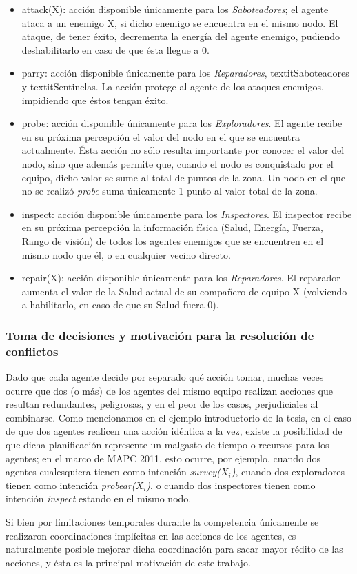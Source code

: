 \begin{itemize}

\item attack(X): acción disponible únicamente para los
\textit{Saboteadores}; el agente ataca a un enemigo X, si dicho
enemigo se encuentra en el mismo nodo.
El ataque, de tener éxito, decrementa la energía del agente enemigo,
pudiendo deshabilitarlo en caso de que ésta llegue a 0.

\item parry: acción disponible únicamente para los
\textit{Reparadores}, textit{Saboteadores} y textit{Sentinelas}.
La acción protege al agente de los ataques enemigos, impidiendo que
éstos tengan éxito.

\item probe: acción disponible únicamente para los
\textit{Exploradores}.
El agente recibe en su próxima percepción el valor del nodo en el que
se encuentra actualmente.
Ésta acción no sólo resulta importante por conocer el valor del nodo,
sino que además permite que, cuando el nodo es conquistado por el
equipo, dicho valor se sume al total de puntos de la zona.
Un nodo en el que no se realizó \textit{probe} suma únicamente 1 punto
al valor total de la zona.

\item inspect: acción disponible únicamente para los
\textit{Inspectores}.
El inspector recibe en su próxima percepción la información física
(Salud, Energía, Fuerza, Rango de visión) de todos los agentes
enemigos que se encuentren en el mismo nodo que él, o en cualquier
vecino directo.

\item repair(X): acción disponible únicamente para los
\textit{Reparadores}.
El reparador aumenta el valor de la Salud actual de su compañero de
equipo X (volviendo a habilitarlo, en caso de que su Salud fuera 0).

\end{itemize}


\subsubsection{Toma de decisiones y motivación para la resolución de
conflictos} \label{sec:toma_de_decisiones}


Dado que cada agente decide por separado qué acción tomar, muchas
veces ocurre que dos (o más) de los agentes del mismo equipo realizan
acciones que resultan redundantes, peligrosas, y en el peor de los
casos, perjudiciales al combinarse.
Como mencionamos en el ejemplo introductorio de la tesis, en el caso
de que dos agentes realicen una acción idéntica a la vez, existe la
posibilidad de que dicha planificación represente un malgasto de
tiempo o recursos para los agentes; en el marco de MAPC 2011, esto
ocurre, por ejemplo, cuando dos agentes cualesquiera tienen como
intención \textit{survey($X_{i}$)}, cuando dos exploradores tienen
como intención \textit{probear($X_{i}$)}, o cuando dos inspectores
tienen como intención \textit{inspect} estando en el mismo nodo.

Si bien por limitaciones temporales durante la competencia únicamente
se realizaron coordinaciones implícitas en las acciones de los
agentes, es naturalmente posible mejorar dicha coordinación para sacar
mayor rédito de las acciones, y ésta es la principal motivación de
este trabajo.
